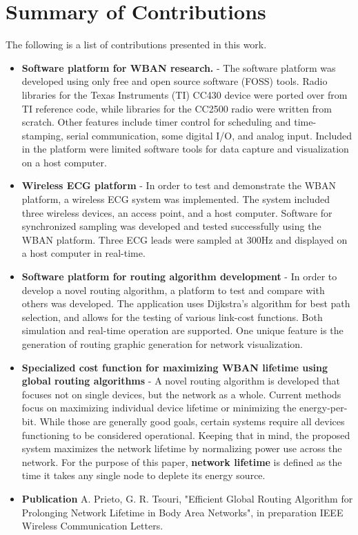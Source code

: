 \documentclass{article}
\begin{document}
\pagebreak

\section*{Summary of Contributions}
The following is a list of contributions presented in this work.
\begin{itemize}
\item \textbf{Software platform for WBAN research.} - The software platform was developed using only free and open source software (FOSS) tools. Radio libraries for the Texas Instruments (TI) CC430 device were ported over from TI reference code, while libraries for the CC2500 radio were written from scratch. Other features include timer control for scheduling and time-stamping, serial communication, some digital I/O, and analog input. Included in the platform were limited software tools for data capture and visualization on a host computer.

\item \textbf{Wireless ECG platform} - In order to test and demonstrate the WBAN platform, a wireless ECG system was implemented. The system included three wireless devices, an access point, and a host computer. Software for synchronized sampling was developed and tested successfully using the WBAN platform. Three ECG leads were sampled at 300Hz and displayed on a host computer in real-time.

\item \textbf{Software platform for routing algorithm development} - In order to develop a novel routing algorithm, a platform to test and compare with others was developed. The application uses Dijkstra's algorithm for best path selection, and allows for the testing of various link-cost functions. Both simulation and real-time operation are supported. One unique feature is the generation of routing graphic generation for network visualization.

\item \textbf{Specialized cost function for maximizing WBAN lifetime using global routing algorithms} - A novel routing algorithm is developed that focuses not on single devices, but the network as a whole. Current methods focus on maximizing individual device lifetime or minimizing the energy-per-bit. While those are generally good goals, certain systems require all devices functioning to be considered operational. Keeping that in mind, the proposed system maximizes the network lifetime by normalizing power use across the network. For the purpose of this paper, \textbf{network lifetime} is defined as the time it takes any single node to deplete its energy source. 

\item \textbf{Publication} A. Prieto, G. R. Tsouri, "Efficient Global Routing Algorithm for Prolonging Network Lifetime in Body Area Networks", in preparation IEEE Wireless Communication Letters.

\end{itemize}
\end{document}
